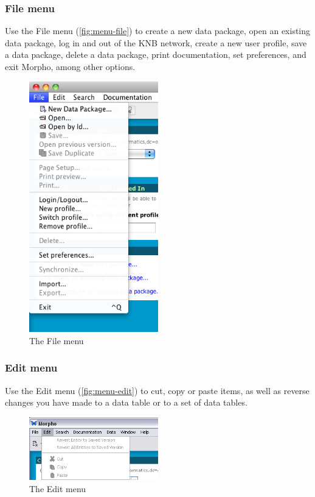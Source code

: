 \subsubsection{File menu} \label{sec:menu-file}

Use the File menu (\autoref{fig:menu-file}) to create a new data
package, open an existing data package, log in and out of the KNB
network, create a new user profile, save a data package, delete a data
package, print documentation, set preferences, and exit Morpho, among
other options. 

\begin{figure}
  \centering
    \includegraphics[width=0.5\textwidth]{images/menu-file.png}
  \caption{The File menu}
  \label{fig:menu-file}
\end{figure}

\subsubsection{Edit menu} \label{sec:menu-edit}

Use the Edit menu (\autoref{fig:menu-edit}) to cut, copy or paste items,
as well as reverse changes you have made to a data table or to a set of
data tables.

\begin{figure}
  \centering
    \includegraphics[width=0.5\textwidth]{images/menu-edit.jpg}
  \caption{The Edit menu}
  \label{fig:menu-edit}
\end{figure}

